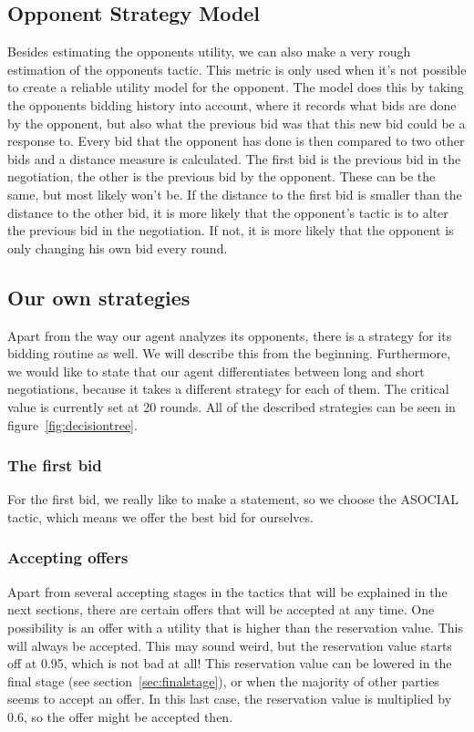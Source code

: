 \subsection{Opponent Strategy Model}
\label{sec:opponentstrategymodel}
Besides estimating the opponents utility, we can also make a very rough estimation of the opponents tactic. This metric is only used when it's not possible to create a reliable utility model for the opponent. The model does this by taking the opponents bidding history into account, where it records what bids are done by the opponent, but also what the previous bid was that this new bid could be a response to. Every bid that the opponent has done is then compared to two other bids and a distance measure is calculated. The first bid is the previous bid in the negotiation, the other is the previous bid by the opponent. These can be the same, but most likely won't be. If the distance to the first bid is smaller than the distance to the other bid, it is more likely that the opponent's tactic is to alter the previous bid in the negotiation. If not, it is more likely that the opponent is only changing his own bid every round. 

\subsection{Our own strategies}
\label{sec:strategy}
Apart from the way our agent analyzes its opponents, there is a strategy for its bidding routine as well. We will describe this from the beginning. Furthermore, we would like to state that our agent differentiates between long and short negotiations, because it takes a different strategy for each of them. The critical value is currently set at 20 rounds. All of the described strategies can be seen in figure~\ref{fig:decisiontree}.



\subsubsection{The first bid}
For the first bid, we really like to make a statement, so we choose the ASOCIAL tactic, which means we offer the best bid for ourselves.

\subsubsection{Accepting offers}
Apart from several accepting stages in the tactics that will be explained in the next sections, there are certain offers that will be accepted at any time. One possibility is an offer with a utility that is higher than the reservation value. This will always be accepted. This may sound weird, but the reservation value starts off at 0.95, which is not bad at all! This reservation value can be lowered in the final stage (see section~\ref{sec:finalstage}), or when the majority of other parties seems to accept an offer. In this last case, the reservation value is multiplied by 0.6, so the offer might be accepted then.

